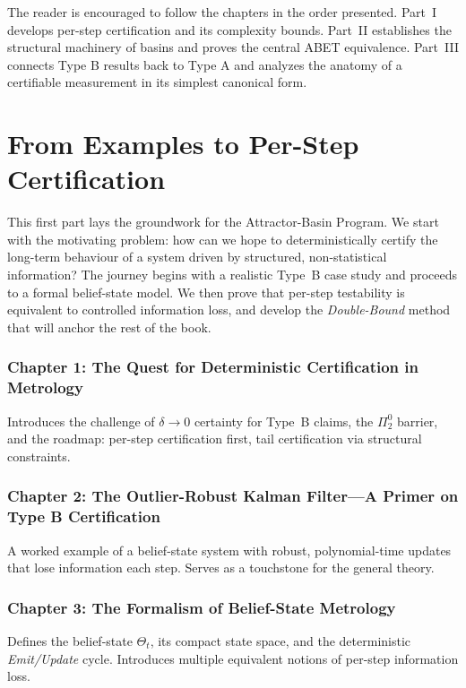 \documentclass[12pt]{article}
\begin{document}
The reader is encouraged to follow the chapters in the order presented. Part~I develops per-step certification and its complexity bounds. Part~II establishes the structural machinery of basins and proves the central ABET equivalence. Part~III connects Type B results back to Type A and analyzes the anatomy of a certifiable measurement in its simplest canonical form.

\newpage
\tableofcontents
\newpage

\part[From Examples to Per-Step Certification]{From Examples to Per-Step Certification}

\noindent
This first part lays the groundwork for the Attractor-Basin Program. We start with the motivating problem: how can we hope to deterministically certify the long-term behaviour of a system driven by structured, non-statistical information? The journey begins with a realistic Type~B case study and proceeds to a formal belief-state model. We then prove that per-step testability is equivalent to controlled information loss, and develop the \emph{Double-Bound} method that will anchor the rest of the book.

\section*{Chapter 1: The Quest for Deterministic Certification in Metrology}
Introduces the challenge of $\delta \to 0$ certainty for Type~B claims, the $\Pi^0_2$ barrier, and the roadmap: per-step certification first, tail certification via structural constraints.

\section*{Chapter 2: The Outlier-Robust Kalman Filter---A Primer on Type B Certification}
A worked example of a belief-state system with robust, polynomial-time updates that lose information each step. Serves as a touchstone for the general theory.

\section*{Chapter 3: The Formalism of Belief-State Metrology}
Defines the belief-state $\Theta_t$, its compact state space, and the deterministic \emph{Emit/Update} cycle. Introduces multiple equivalent notions of per-step information loss.
\end{document}
